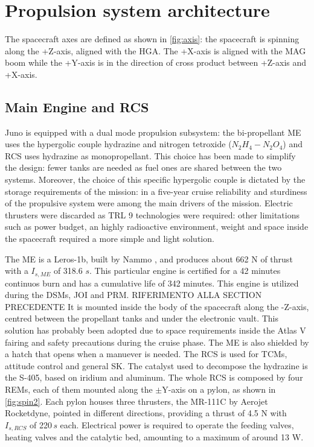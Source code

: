 \section{Propulsion system architecture}
\label{sec:prop_architecture}


The spacecraft axes are defined as shown in \autoref{fig:axis}: the spacecraft is spinning along the +Z-axis, aligned with the HGA. The +X-axis is aligned with the MAG boom while the +Y-axis is in the direction of cross product between +Z-axis and +X-axis.


\subsection{Main Engine and RCS}
\label{sec:me and rcs}

Juno is equipped with a dual mode propulsion subsystem: the bi-propellant ME uses the hypergolic couple hydrazine and nitrogen tetroxide ($N_2H_4 - N_2O_4$) and RCS uses hydrazine as monopropellant. This choice has been made to simplify the design: fewer tanks are needed as fuel ones are shared between the two systems. Moreover, the choice of this specific hypergolic couple is dictated by the storage requirements of the mission: in a five-year cruise reliability and sturdiness of the propulsive system were among the main drivers of the mission. Electric thrusters were discarded as TRL 9 technologies were required: other limitations such as power budget, an highly radioactive environment, weight and space inside the spacecraft required a more simple and light solution. 
 
The ME is a Leros-1b, built by Nammo \cite{Leros}, and produces about 662 N of thrust with a $I_{s, ME}$ of 318.6 \;$s$. This particular engine is certified for a 42 minutes continuos burn and has a cumulative life of 342 minutes.  This engine is utilized during the DSMs, JOI and PRM. RIFERIMENTO ALLA SECTION PRECEDENTE It is mounted inside the body of the spacecraft along the -Z-axis, centred between the propellant tanks and under the electronic vault. This solution has probably been adopted due to space requirements inside the Atlas V fairing and safety precautions during the cruise phase. The ME is also shielded by a hatch that opens when a manuever is needed.
The RCS is used for TCMs, attitude control and general SK. The catalyst used to decompose the hydrazine is the S-405, based on iridium and aluminum\cite{s405}.
The whole RCS is composed by four REMs, each of them mounted along the $\pm$Y-axis on a pylon, as shown in \autoref{fig:spin2}. Each pylon houses three thrusters, the MR-111C by Aerojet Rocketdyne\cite{RCS_info}, pointed in different directions, providing a thrust of 4.5 N with $I_{s, RCS}$ of 220\,$s$ each. Electrical power is required to operate the feeding valves, heating valves and the catalytic bed, amounting to a maximum of around 13 W\cite{RCS_values}. 

